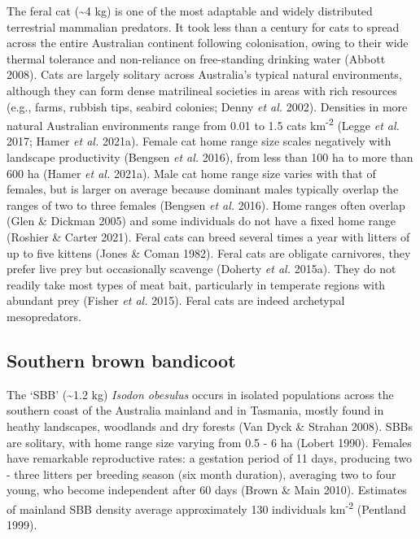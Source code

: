 \documentclass[11pt,a4paper,titlepage,twoside,openright]{style/unimelbthesis}
\begin{document}
\begin{mainmatter}
The feral cat (\textasciitilde4 kg) is one of the most adaptable and widely distributed terrestrial mammalian predators. It took less than a century for cats to spread across the entire Australian continent following colonisation, owing to their wide thermal tolerance and non-reliance on free-standing drinking water (Abbott 2008). Cats are largely solitary across Australia's typical natural environments, although they can form dense matrilineal societies in areas with rich resources (e.g., farms, rubbish tips, seabird colonies; Denny \emph{et al.} 2002). Densities in more natural Australian environments range from 0.01 to 1.5 cats km\textsuperscript{-2} (Legge \emph{et al.} 2017; Hamer \emph{et al.} 2021a). Female cat home range size scales negatively with landscape productivity (Bengsen \emph{et al.} 2016), from less than 100 ha to more than 600 ha (Hamer \emph{et al.} 2021a). Male cat home range size varies with that of females, but is larger on average because dominant males typically overlap the ranges of two to three females (Bengsen \emph{et al.} 2016). Home ranges often overlap (Glen \& Dickman 2005) and some individuals do not have a fixed home range (Roshier \& Carter 2021). Feral cats can breed several times a year with litters of up to five kittens (Jones \& Coman 1982). Feral cats are obligate carnivores, they prefer live prey but occasionally scavenge (Doherty \emph{et al.} 2015a). They do not readily take most types of meat bait, particularly in temperate regions with abundant prey (Fisher \emph{et al.} 2015). Feral cats are indeed archetypal mesopredators.

\hypertarget{southern-brown-bandicoot}{%
\subsection{Southern brown bandicoot}\label{southern-brown-bandicoot}}

The `SBB' (\textasciitilde1.2 kg) \emph{Isodon obesulus} occurs in isolated populations across the southern coast of the Australia mainland and in Tasmania, mostly found in heathy landscapes, woodlands and dry forests (Van Dyck \& Strahan 2008). SBBs are solitary, with home range size varying from 0.5 - 6 ha (Lobert 1990). Females have remarkable reproductive rates: a gestation period of 11 days, producing two - three litters per breeding season (six month duration), averaging two to four young, who become independent after 60 days (Brown \& Main 2010). Estimates of mainland SBB density average approximately 130 individuals km\textsuperscript{-2} (Pentland 1999).


\end{mainmatter}
\end{document}
